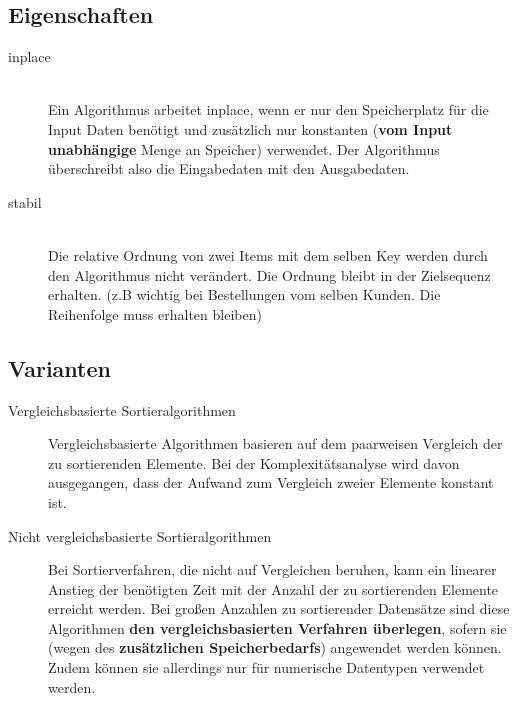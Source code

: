\subsection{Eigenschaften}
\begin{description}
	\item[inplace] \hfill \\
	Ein Algorithmus arbeitet inplace, wenn er nur den Speicherplatz für die Input Daten benötigt und zusätzlich nur konstanten (\textbf{vom Input unabhängige} Menge an Speicher) verwendet. Der Algorithmus überschreibt also die Eingabedaten mit den Ausgabedaten.	
	\item[stabil]  \hfill \\
	Die relative Ordnung von zwei Items mit dem selben Key werden durch den Algorithmus nicht verändert. Die Ordnung bleibt in der Zielsequenz erhalten. (z.B wichtig bei Bestellungen vom selben Kunden. Die Reihenfolge muss erhalten bleiben)
\end{description}

\subsection{Varianten}
\begin{description}
	\item[Vergleichsbasierte Sortieralgorithmen] Vergleichsbasierte Algorithmen basieren auf dem paarweisen Vergleich der zu sortierenden Elemente. Bei der Komplexitätsanalyse wird davon ausgegangen, dass der Aufwand zum Vergleich zweier Elemente konstant ist.
	\item[Nicht vergleichsbasierte Sortieralgorithmen] Bei Sortierverfahren, die nicht auf Vergleichen beruhen, kann ein linearer Anstieg der benötigten Zeit mit der Anzahl der zu sortierenden Elemente erreicht werden. Bei großen Anzahlen zu sortierender Datensätze sind diese Algorithmen \textbf{den vergleichsbasierten Verfahren überlegen}, sofern sie (wegen des \textbf{zusätzlichen Speicherbedarfs}) angewendet werden können. Zudem können sie allerdings nur für numerische Datentypen verwendet werden.
\end{description}

